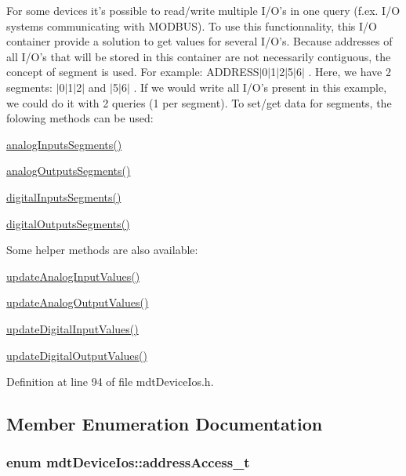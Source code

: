 For some devices it's possible to read/write multiple I/\-O's in one query (f.\-ex. I/\-O systems communicating with M\-O\-D\-B\-U\-S). To use this functionnality, this I/\-O container provide a solution to get values for several I/\-O's. Because addresses of all I/\-O's that will be stored in this container are not necessarily contiguous, the concept of segment is used. For example\-: A\-D\-D\-R\-E\-S\-S$\vert$0$\vert$1$\vert$2$\vert$5$\vert$6$\vert$ . Here, we have 2 segments\-: $\vert$0$\vert$1$\vert$2$\vert$ and $\vert$5$\vert$6$\vert$ . If we would write all I/\-O's present in this example, we could do it with 2 queries (1 per segment). To set/get data for segments, the folowing methods can be used\-:
\begin{DoxyItemize}
\item \hyperlink{classmdt_device_ios_a71a1b9cdbc524e4d0094ab37575defc1}{analog\-Inputs\-Segments()}
\item \hyperlink{classmdt_device_ios_afc425a36dd8942a507d993993bc141a9}{analog\-Outputs\-Segments()}
\item \hyperlink{classmdt_device_ios_adc81519c2e6edc7fe54663c77d6eb503}{digital\-Inputs\-Segments()}
\item \hyperlink{classmdt_device_ios_ad2b06fe61d71150ac57d77e9bfc7894b}{digital\-Outputs\-Segments()}
\end{DoxyItemize}

Some helper methods are also available\-:
\begin{DoxyItemize}
\item \hyperlink{classmdt_device_ios_addeff0a2dab646a49170f8be10cc46fb}{update\-Analog\-Input\-Values()}
\item \hyperlink{classmdt_device_ios_a3aee92ecadda601d9482aeb6419f0bb8}{update\-Analog\-Output\-Values()}
\item \hyperlink{classmdt_device_ios_ae994a3ef4d4f101ac185308e4afc05cb}{update\-Digital\-Input\-Values()}
\item \hyperlink{classmdt_device_ios_a06642814dbbb525dff7d1a7e603f57ac}{update\-Digital\-Output\-Values()} 
\end{DoxyItemize}

Definition at line 94 of file mdt\-Device\-Ios.\-h.



\subsection{Member Enumeration Documentation}
\hypertarget{classmdt_device_ios_a72fc3fdcd905d669b1e90496e808d6dd}{
\subsubsection[{address\-Access\-\_\-t}]{\setlength{\rightskip}{0pt plus 5cm}enum {\bf mdt\-Device\-Ios\-::address\-Access\-\_\-t}}}\label{classmdt_device_ios_a72fc3fdcd905d669b1e90496e808d6dd}


